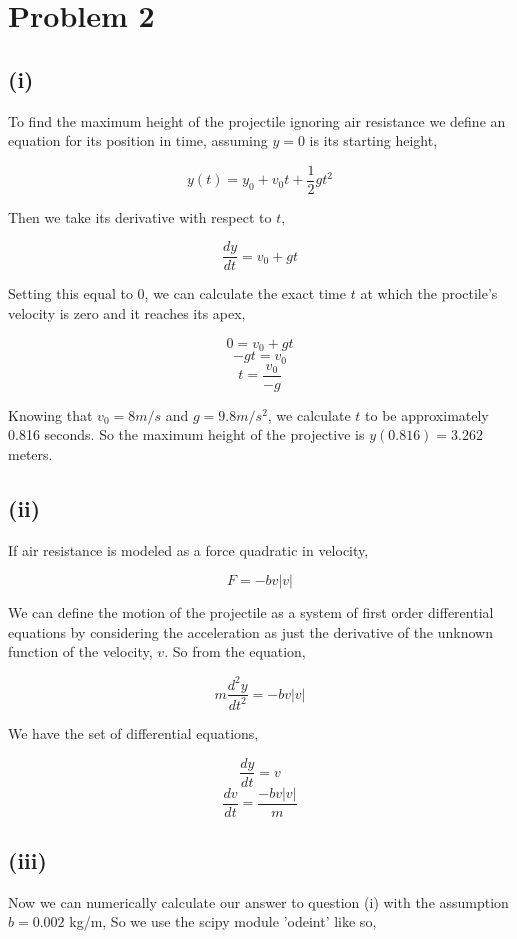\documentclass{article}
\begin{document}
\section*{Problem 2}

\subsection*{(i)}
To find the maximum height of the projectile ignoring air resistance we define an equation for its position in time, assuming $y = 0$ is its starting height,

$$ y(t) = y_{0} + v_{0}t + \frac{1}{2}gt^{2} $$

Then we take its derivative with respect to $t$,

$$ \frac{dy}{dt} = v_{0} + gt $$

Setting this equal to $0$, we can calculate the exact time $t$ at which the proctile's velocity is zero and it reaches its apex,

$$ 0 = v_{0} + gt $$
$$ -gt = v_{0} $$
$$ t = \frac{v_{0}}{-g}$$

Knowing that $v_{0} = 8 m/s$ and $g = 9.8 m/s^2$, we calculate $t$ to be approximately 0.816 seconds.
So the maximum height of the projective is $y(0.816) = 3.262$ meters.

\subsection*{(ii)}
If air resistance is modeled as a force quadratic in velocity,

$$ F = -bv|v|$$

We can define the motion of the projectile as a system of first order differential equations by considering the acceleration as just the derivative of the unknown function of the velocity, $v$.  So from the equation,

$$ m\frac{d^{2}y}{dt^{2}} = -bv|v|$$

We have the set of differential equations,

$$ \frac{dy}{dt} = v  $$
$$ \frac{dv}{dt} = \frac{-bv|v|}{m} $$

\subsection*{(iii)}
Now we can numerically calculate our answer to question (i) with the assumption $ b = 0.002 $ kg/m,
So we use the scipy module 'odeint' like so, 

\vspace{20 mm}
\end{document}
